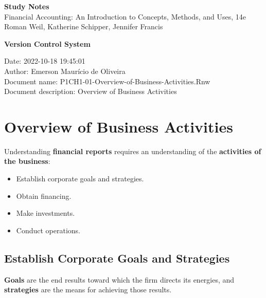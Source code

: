\documentclass{article}\usepackage[]{graphicx}\usepackage[]{xcolor}
\begin{document}
\setlength{\abovedisplayskip}{0pt}
\setlength{\belowdisplayskip}{0pt}
\setlength{\abovedisplayshortskip}{0pt}
\setlength{\belowdisplayshortskip}{0pt}



\begin{center}
\LARGE
\textbf{Study Notes}\\
\vspace{0.5 cm}
\large
Financial Accounting: An Introduction to Concepts, Methods, and Uses, 14e\\
Roman Weil, Katherine Schipper, Jennifer Francis
\end{center}

\vspace{0.5 cm}

\textbf{Version Control System}\par

Date: 2022-10-18 19:45:01\\
Author: Emerson Maurício de Oliveira\\
Document name: P1CH1-01-Overview-of-Business-Activities.Rnw\\
Document description: Overview of Business Activities\par

\section{Overview of Business Activities}

Understanding \textbf{financial reports} requires an understanding of the \textbf{activities of the business}:

\begin{itemize}
  \item Establish corporate goals and strategies.
  \item Obtain financing.
  \item Make investments.
  \item Conduct operations.
\end{itemize}

\subsection{Establish Corporate Goals and Strategies}

\textbf{Goals} are the end results toward which the firm directs its energies, and 
\textbf{strategies} are the means for achieving those results.\par
\end{document}
